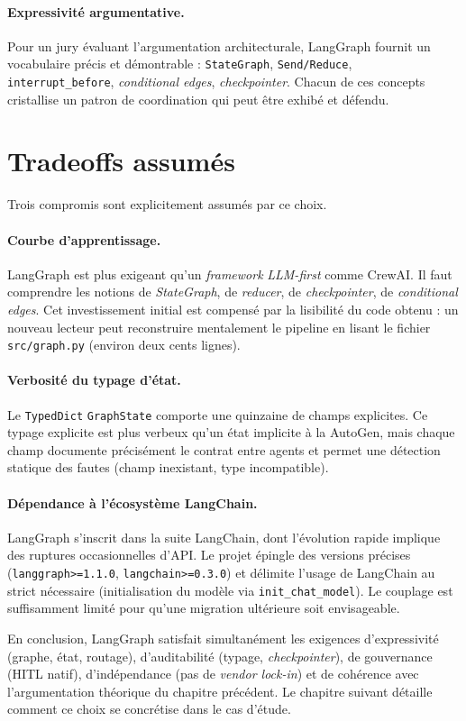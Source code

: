 \paragraph{Expressivité argumentative.}
Pour un jury évaluant l'argumentation architecturale, LangGraph fournit un vocabulaire précis et démontrable : \texttt{StateGraph}, \texttt{Send/Reduce}, \texttt{interrupt\_before}, \emph{conditional edges}, \emph{checkpointer}. Chacun de ces concepts cristallise un patron de coordination qui peut être exhibé et défendu.

\section{Tradeoffs assumés}
\label{sec:tradeoffs}

Trois compromis sont explicitement assumés par ce choix.

\paragraph{Courbe d'apprentissage.}
LangGraph est plus exigeant qu'un \emph{framework} \emph{LLM-first} comme CrewAI. Il faut comprendre les notions de \emph{StateGraph}, de \emph{reducer}, de \emph{checkpointer}, de \emph{conditional edges}. Cet investissement initial est compensé par la lisibilité du code obtenu : un nouveau lecteur peut reconstruire mentalement le pipeline en lisant le fichier \texttt{src/graph.py} (environ deux cents lignes).

\paragraph{Verbosité du typage d'état.}
Le \texttt{TypedDict} \texttt{GraphState} comporte une quinzaine de champs explicites. Ce typage explicite est plus verbeux qu'un état implicite à la AutoGen, mais chaque champ documente précisément le contrat entre agents et permet une détection statique des fautes (champ inexistant, type incompatible).

\paragraph{Dépendance à l'écosystème LangChain.}
LangGraph s'inscrit dans la suite LangChain, dont l'évolution rapide implique des ruptures occasionnelles d'API. Le projet épingle des versions précises (\texttt{langgraph>=1.1.0}, \texttt{langchain>=0.3.0}) et délimite l'usage de LangChain au strict nécessaire (initialisation du modèle via \texttt{init\_chat\_model}). Le couplage est suffisamment limité pour qu'une migration ultérieure soit envisageable.

\medskip

En conclusion, LangGraph satisfait simultanément les exigences d'expressivité (graphe, état, routage), d'auditabilité (typage, \emph{checkpointer}), de gouvernance (HITL natif), d'indépendance (pas de \emph{vendor lock-in}) et de cohérence avec l'argumentation théorique du chapitre précédent. Le chapitre suivant détaille comment ce choix se concrétise dans le cas d'étude.
